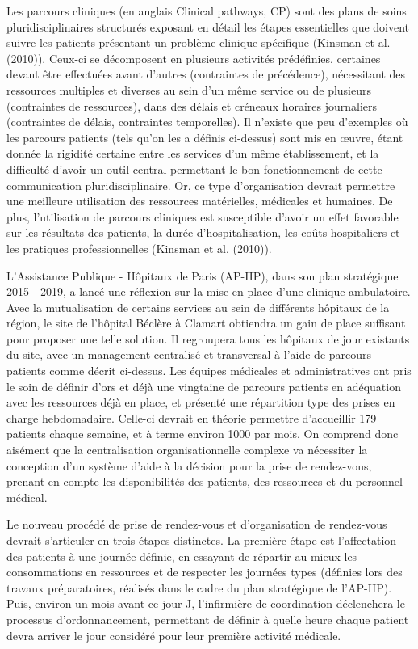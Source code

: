 \documentclass{polytech/polytech}
\begin{document}
Les parcours cliniques (en anglais Clinical pathways, CP) sont des plans de soins pluridisciplinaires structurés exposant en détail les étapes essentielles que doivent suivre les patients présentant un problème clinique spécifique (Kinsman et al. (2010)). Ceux-ci se décomposent en plusieurs activités prédéfinies, certaines devant être effectuées avant d'autres (contraintes de précédence), nécessitant des ressources multiples et diverses au sein d'un même service ou de plusieurs (contraintes de ressources), dans des délais et créneaux horaires journaliers (contraintes de délais, contraintes temporelles). Il n'existe que peu d'exemples où les parcours patients (tels qu'on les a définis ci-dessus) sont mis en œuvre, étant donnée la rigidité certaine entre les services d'un même établissement, et la difficulté d'avoir un outil central permettant le bon fonctionnement de cette communication pluridisciplinaire. Or, ce type d'organisation devrait permettre une meilleure utilisation des ressources matérielles, médicales et humaines. De plus, l'utilisation de parcours cliniques est susceptible d'avoir un effet favorable sur les résultats des patients, la durée d'hospitalisation, les coûts hospitaliers et les pratiques professionnelles (Kinsman et al. (2010)).

L'Assistance Publique - Hôpitaux de Paris (AP-HP), dans son plan stratégique 2015 - 2019, a lancé une réflexion sur la mise en place d'une clinique ambulatoire. Avec la mutualisation de certains services au sein de différents hôpitaux de la région, le site de l'hôpital Béclère à Clamart obtiendra un gain de place suffisant pour proposer une telle solution. Il regroupera tous les hôpitaux de jour existants du site, avec un management centralisé et transversal à l’aide de parcours patients comme décrit ci-dessus. Les équipes médicales et administratives ont pris le soin de définir d'ors et déjà une vingtaine de parcours patients en adéquation avec les ressources déjà en place, et présenté une répartition type des prises en charge hebdomadaire. Celle-ci devrait en théorie permettre d'accueillir 179 patients chaque semaine, et à terme environ 1000 par mois. On comprend donc aisément que la centralisation organisationnelle complexe va nécessiter la conception d'un système d'aide à la décision pour la prise de rendez-vous, prenant en compte les disponibilités des patients, des ressources et du personnel médical.

Le nouveau procédé de prise de rendez-vous et d'organisation de rendez-vous devrait s'articuler en trois étapes distinctes. La première étape est l'affectation des patients à une journée définie, en essayant de répartir au mieux les consommations en ressources et de respecter les journées types (définies lors des travaux préparatoires, réalisés dans le cadre du plan stratégique de l'AP-HP). Puis, environ un mois avant ce jour J, l'infirmière de coordination déclenchera le processus d'ordonnancement, permettant de définir à quelle heure chaque patient devra arriver le jour considéré pour leur première activité médicale.
\end{document}
